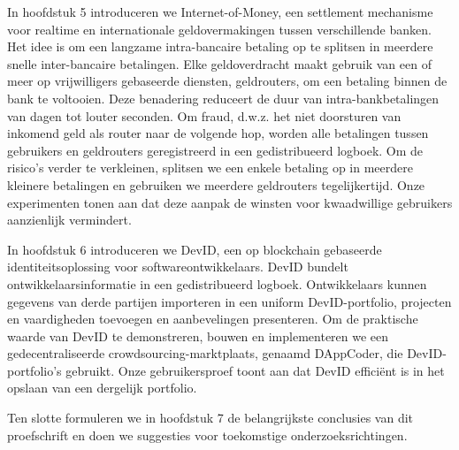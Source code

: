 {In hoofdstuk 5 introduceren we Internet-of-Money, een settlement mechanisme voor realtime en internationale geldovermakingen tussen verschillende banken.
Het idee is om een ​​langzame intra-bancaire betaling op te splitsen in meerdere snelle inter-bancaire betalingen.
Elke geldoverdracht maakt gebruik van een of meer op vrijwilligers gebaseerde diensten, geldrouters, om een ​​betaling binnen de bank te voltooien.
Deze benadering reduceert de duur van intra-bankbetalingen van dagen tot louter seconden.
Om fraud, d.w.z. het niet doorsturen van inkomend geld als router naar de volgende hop, worden alle betalingen tussen gebruikers en geldrouters geregistreerd in een gedistribueerd logboek.
Om de risico's verder te verkleinen, splitsen we een enkele betaling op in meerdere kleinere betalingen en gebruiken we meerdere geldrouters tegelijkertijd.
Onze experimenten tonen aan dat deze aanpak de winsten voor kwaadwillige gebruikers aanzienlijk vermindert.

In hoofdstuk 6 introduceren we DevID, een op blockchain gebaseerde identiteitsoplossing voor softwareontwikkelaars.
DevID bundelt ontwikkelaarsinformatie in een gedistribueerd logboek.
Ontwikkelaars kunnen gegevens van derde partijen importeren in een uniform DevID-portfolio, projecten en vaardigheden toevoegen en aanbevelingen presenteren.
Om de praktische waarde van DevID te demonstreren, bouwen en implementeren we een gedecentraliseerde crowdsourcing-marktplaats, genaamd DAppCoder, die DevID-portfolio's gebruikt.
Onze gebruikersproef toont aan dat DevID efficiënt is in het opslaan van een dergelijk portfolio.

Ten slotte formuleren we in hoofdstuk 7 de belangrijkste conclusies van dit proefschrift en doen we suggesties voor toekomstige onderzoeksrichtingen.
}



